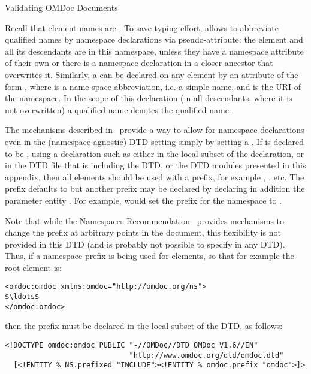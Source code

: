 \begin{module}[id=validating]
\begin{omgroup}[id=validating]{Validating OMDoc Documents}
\begin{omtext}
  Recall that element names are . To save
  typing effort, {\xml} allows to abbreviate qualified names by namespace declarations via
  {} pseudo-attribute: the element and all its descendants are in this
  namespace, unless they have a namespace attribute of their own or there is a namespace
  declaration in a closer ancestor that overwrites it.  Similarly, a
  {} can be declared on any element by an attribute of
  the form {}, where {} is a name space
  abbreviation, i.e. a simple name, and {} is the URI of the namespace.  In
  the scope of this declaration (in all descendants, where it is not overwritten) a
  qualified name {} denotes the qualified name {}.
\end{omtext}

\begin{omtext}
  The mechanisms described in~\cite{AltBou:mox01} provide a way to allow for namespace
  declarations even in the (namespace-agnostic) DTD setting simply by setting a
  {}. If {} is declared to be
  {}, using a declaration such as {} either in the local subset of the {} declaration, or
  in the DTD file that is including the {\omdoc} DTD, or the DTD modules presented in this
  appendix, then all {\omdoc} elements should be used with a prefix, for example
  {}, {}, etc. The prefix defaults to
  {} but another prefix may be declared by declaring in addition the
  parameter entity {}. For example, {} would set the prefix for the {\omdoc} namespace to
  {}.
\end{omtext}

Note that while the Namespaces Recommendation~\cite{BraHol:xmlns99} provides
mechanisms to change the prefix at arbitrary points in the document, this
flexibility is not provided in this DTD (and is probably not possible to specify
in any DTD).  Thus, if a namespace prefix is being used for {\omdoc} elements, so
that for example the root element is:
\begin{lstlisting}[index={omdoc:omdoc},mathescape]
<omdoc:omdoc xmlns:omdoc="http://omdoc.org/ns">
$\ldots$
</omdoc:omdoc>
\end{lstlisting}
then the prefix must be declared in the local subset of the DTD, as follows:
\begin{lstlisting}[index={omdoc:omdoc,DOCTYPE,ENTITY,NS.prefixed,INCLUDE}]
<!DOCTYPE omdoc:omdoc PUBLIC "-//OMDoc//DTD OMDoc V1.6//EN"
                             "http://www.omdoc.org/dtd/omdoc.dtd"
  [<!ENTITY % NS.prefixed "INCLUDE"><!ENTITY % omdoc.prefix "omdoc">]>
\end{lstlisting}


\end{omgroup}
\end{module}
